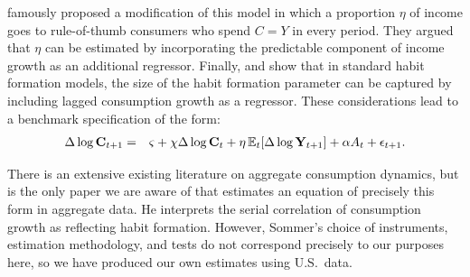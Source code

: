 \documentclass[titlepage]{./econtex}
\begin{document}
\cite{cmModel} famously proposed a modification of this model in which a proportion $\eta$ of income goes to rule-of-thumb consumers who spend $C=Y$ in every period.  They argued that $\eta$ can be estimated by incorporating the predictable component of income growth as an additional regressor.  Finally, \cite{dynanHabits} and \cite{som07} show that in standard habit formation models, the size of the habit formation parameter can be captured by including lagged consumption growth as a regressor.  These considerations lead to a benchmark specification of the form:
\begin{eqnarray}
  \label{eq:CGrowBench}
  \Delta \log \mathbf{C}_{t+1} & = & \varsigma+\chi \Delta \log \mathbf{C}_{t}+\eta \operatorname{\mathbb{E}}_{t}[\Delta \log \mathbf{Y}_{t+1}]+\alpha A_{t}+\epsilon_{t+1}.
\end{eqnarray}

There is an extensive existing literature on aggregate consumption dynamics, but \cite{som07} is the only paper we are aware of that estimates an equation of precisely this form in aggregate data.  He interprets the serial correlation of consumption growth as reflecting habit formation. However, Sommer's choice of instruments, estimation methodology, and tests do not correspond precisely to our purposes here, so we have produced our own estimates using U.S.\ data.

\end{document}

